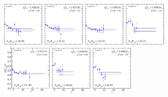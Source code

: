 \begin{figure}[H]
    \includegraphics[width=0.18\textwidth]{figures/sigmas/g2g/fits/fit_20.pdf}
    \includegraphics[width=0.18\textwidth]{figures/sigmas/g2g/fits/fit_22.pdf}
    \includegraphics[width=0.18\textwidth]{figures/sigmas/g2g/fits/fit_11.pdf}
    \includegraphics[width=0.18\textwidth]{figures/sigmas/g2g/fits/fit_28.pdf}\\
    \includegraphics[width=0.215\textwidth]{figures/sigmas/g2g/fits/fit_9.pdf}
    \includegraphics[width=0.18\textwidth]{figures/sigmas/g2g/fits/fit_30.pdf}
    \includegraphics[width=0.18\textwidth]{figures/sigmas/g2g/fits/fit_27.pdf}

\end{figure}
